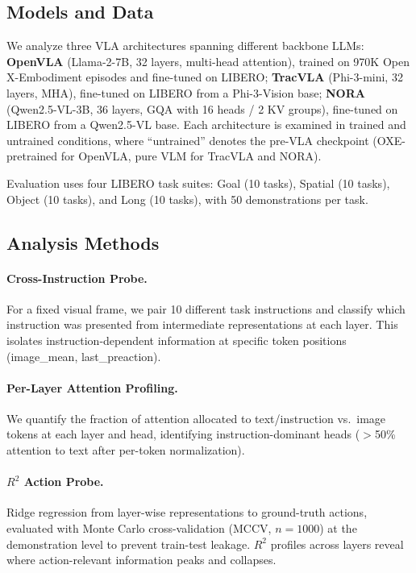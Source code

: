 \documentclass[10pt,letterpaper]{article}
\begin{document}
\subsection{Models and Data}

We analyze three VLA architectures spanning different backbone LLMs:
\textbf{OpenVLA} (Llama-2-7B, 32 layers, multi-head attention), trained on 970K Open X-Embodiment episodes and fine-tuned on LIBERO;
\textbf{TracVLA} (Phi-3-mini, 32 layers, MHA), fine-tuned on LIBERO from a Phi-3-Vision base;
\textbf{NORA} (Qwen2.5-VL-3B, 36 layers, GQA with 16 heads / 2 KV groups), fine-tuned on LIBERO from a Qwen2.5-VL base.
Each architecture is examined in trained and untrained conditions, where ``untrained'' denotes the pre-VLA checkpoint (OXE-pretrained for OpenVLA, pure VLM for TracVLA and NORA).

Evaluation uses four LIBERO task suites: Goal (10 tasks), Spatial (10 tasks), Object (10 tasks), and Long (10 tasks), with 50 demonstrations per task.

\subsection{Analysis Methods}

\paragraph{Cross-Instruction Probe.}
For a fixed visual frame, we pair 10 different task instructions and classify which instruction was presented from intermediate representations at each layer. This isolates instruction-dependent information at specific token positions (image\_mean, last\_preaction).

\paragraph{Per-Layer Attention Profiling.}
We quantify the fraction of attention allocated to text/instruction vs.\ image tokens at each layer and head, identifying instruction-dominant heads ($>$50\% attention to text after per-token normalization).

\paragraph{$R^2$ Action Probe.}
Ridge regression from layer-wise representations to ground-truth actions, evaluated with Monte Carlo cross-validation (MCCV, $n=1000$) at the demonstration level to prevent train-test leakage. $R^2$ profiles across layers reveal where action-relevant information peaks and collapses.
\end{document}
